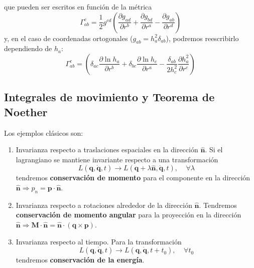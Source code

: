 \documentclass[]{article}
\numberwithin{equation}{section}
\begin{document}
que pueden ser escritos en función de la métrica
\begin{equation}
	\Gamma^{c}_{ab} = \frac{1}{2} g^{cd} \left(\frac{\partial g_{ad}}{\partial r^b} + \frac{\partial g_{bd}}{\partial r^a} - \frac{\partial g_{ab}}{\partial r^d}\right)
\end{equation}
y, en el caso de coordenadas ortogonales (\(g_{ab} = h_a^2\delta_{ab}\)), podremos reescribirlo dependiendo de \(h_a\):
\begin{equation}
	\Gamma^{c}_{ab} = \left(\delta_{ac}\frac{\partial \ln h_{a}}{\partial r^b} + \delta_{bc}\frac{\partial \ln h_{c}}{\partial r^a} - \frac{\delta_{ab}}{2 h_c^2}\frac{\partial h_{a}^2}{\partial r^c}\right)
\end{equation}

\subsection{Integrales de movimiento y Teorema de Noether}
Los ejemplos clásicos son:
\begin{enumerate}
	\item Invarianza respecto a traslaciones espaciales en la dirección \(\hat{\mathbf{n}}\). Si el lagrangiano se mantiene invariante respecto a una transformación
	\begin{equation*}
		L(\mathbf{q}, \dot{\mathbf{q}}, t) \rightarrow L(\mathbf{q} + \lambda\hat{\mathbf{n}}, \dot{\mathbf{q}}, t), \ \ \ \ \ \forall \lambda
	\end{equation*}
	tendremos \textbf{conservación de momento} para el componente en la dirección \(\hat{\mathbf{n}} \Rightarrow p_n = \mathbf{p}\cdot\hat{\mathbf{n}}\).
	\item Invarianza respecto a rotaciones alrededor de la dirección \(\hat{\mathbf{n}}\). Tendremos \textbf{conservación de momento angular} para la proyección en la dirección \(\hat{\mathbf{n}} \Rightarrow \mathbf{M}\cdot\hat{\mathbf{n}} = \hat{\mathbf{n}}\cdot\left(\mathbf{q}\times\mathbf{p}\right)\).
	\item Invarianza respecto al tiempo. Para la transformación
	\begin{equation*}
		L(\mathbf{q}, \dot{\mathbf{q}}, t) \rightarrow L(\mathbf{q}, \dot{\mathbf{q}}, t + t_0), \ \ \ \ \ \forall t_0
	\end{equation*}
	tendremos \textbf{conservación de la energía}.
\end{enumerate}
\end{document}
